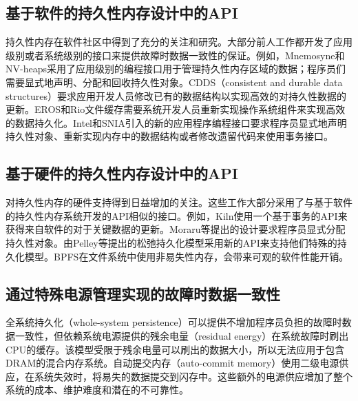\subsection{基于软件的持久性内存设计中的API}
持久性内存在软件社区中得到了充分的关注和研究\cite{Volos:2011:MLP:1950365.1950379,
Coburn:2011:NMP:1950365.1950380,
Venkataraman:2011:CDD:1960475.1960480, Intel:PMEM, SNIA:2013:NPM,
Shapiro:1999:EFC:319151.319163, Chen:1996:RFC:237090.237154}。大部分前人工作都开发了应用级别或者系统级别的接口来提供故障时数据一致性的保证。例如，Mnemosyne\cite{Volos:2011:MLP:1950365.1950379}和NV-heaps\cite{Coburn:2011:NMP:1950365.1950380}采用了应用级别的编程接口用于管理持久性内存区域的数据；程序员们需要显式地声明、分配和回收持久性对象。CDDS（consistent and durable data structures）\cite{Venkataraman:2011:CDD:1960475.1960480}要求应用开发人员修改已有的数据结构以实现高效的对持久性数据的更新。EROS\cite{Shapiro:1999:EFC:319151.319163}和Rio文件缓存\cite{Chen:1996:RFC:237090.237154}需要系统开发人员重新实现操作系统组件来实现高效的数据持久化。Intel\cite{Intel:PMEM}和SNIA\cite{SNIA:2013:NPM}引入的新的应用程序编程接口要求程序员显式地声明持久性对象\cite{Volos:2011:MLP:1950365.1950379,
Coburn:2011:NMP:1950365.1950380}、重新实现内存中的数据结构\cite{Venkataraman:2011:CDD:1960475.1960480}或者修改遗留代码来使用事务接口\cite{Volos:2011:MLP:1950365.1950379,Coburn:2011:NMP:1950365.1950380}。

\subsection{基于硬件的持久性内存设计中的API}
对持久性内存的硬件支持得到日益增加的关注\cite{meza2013case, Condit:2009:BIT:1629575.1629589,
Zhao:2013:KCP:2540708.2540744, Moraru:2013:CDS, Pelley:2013:SMN,
Kannan:2014:RCP, Liu:2014:NDU:2541940.2541957, Pelley:2014:MP,
6378661, 6974684, 7011385, justin-taco14}。这些工作大部分采用了与基于软件的持久性内存系统开发的API相似的接口。例如，Kiln\cite{Zhao:2013:KCP:2540708.2540744}使用一个基于事务的API来获得来自软件的对于关键数据的更新。Moraru等\cite{Moraru:2013:CDS}提出的设计要求程序员显式分配持久性对象。由Pelley等\cite{Pelley:2014:MP}提出的松弛持久化模型采用新的API来支持他们特殊的持久化模型。BPFS\cite{Condit:2009:BIT:1629575.1629589}在文件系统中使用非易失性内存，会带来可观的软件性能开销。

\subsection{通过特殊电源管理实现的故障时数据一致性}
全系统持久化（whole-system persistence）\cite{Narayanan:2012:WP:2150976.2151018}可以提供不增加程序员负担的故障时数据一致性，但依赖系统电源提供的残余电量（residual energy）在系统故障时刷出CPU的缓存。该模型受限于残余电量可以刷出的数据大小，所以无法应用于包含DRAM的混合内存系统。自动提交内存（auto-commit memory）\cite{flynn2012apparatus}使用二级电源供应，在系统失效时，将易失的数据提交到闪存中。这些额外的电源供应增加了整个系统的成本、维护难度和潜在的不可靠性。



